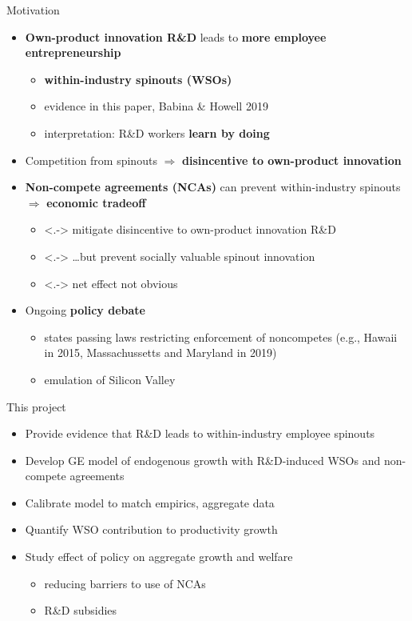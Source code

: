 \documentclass[english,usenames,dvipsnames]{beamer}
\begin{document}
\begin{frame}{Motivation}\label{motivation}
\begin{itemize}
	\item<+-> \alert{\textbf{Own-product innovation R\&D}} leads to \alert{\textbf{more employee entrepreneurship}}
	\begin{itemize}
		\item \alert{\textbf{within-industry spinouts (WSOs)}}
		\hyperlink{spinouts_examples}{} \hyperlink{spinouts_facts_from_literature}{} 
		\item evidence in this paper, Babina \& Howell 2019
		\item interpretation: R\&D workers \alert{\textbf{learn by doing}} 
	\end{itemize}
	\smallskip
	\item<+-> Competition from spinouts $\Rightarrow$ \alert{\textbf{disincentive to own-product innovation}}
	\smallskip
	\item<+-> \alert{\textbf{Non-compete agreements (NCAs)}} can prevent within-industry spinouts $\Rightarrow$ \alert{\textbf{economic tradeoff}}
	\begin{itemize}
		\item<.-> mitigate disincentive to own-product innovation R\&D
		\item<.-> \ldots but prevent socially valuable spinout innovation
		\item<.-> net effect not obvious
	\end{itemize}
	\smallskip
	\item<+-> Ongoing \alert{\textbf{policy debate}}
	\begin{itemize}
		\item states passing laws restricting enforcement of noncompetes (e.g., Hawaii in 2015, Massachussetts and Maryland in 2019) 
		\item emulation of Silicon Valley
	\end{itemize}
\end{itemize}
\end{frame}

\begin{frame}{This project}
\begin{itemize}
	\item Provide evidence that R\&D leads to within-industry employee spinouts
	\smallskip
	\item Develop GE model of endogenous growth with R\&D-induced WSOs and non-compete agreements
	\smallskip
	\item Calibrate model to match empirics, aggregate data
	\smallskip
	\item Quantify WSO contribution to productivity growth
	\smallskip
	\item Study effect of policy on aggregate growth and welfare
	\begin{itemize}
		\item reducing barriers to use of NCAs
		\item R\&D subsidies
	\end{itemize}
\end{itemize}
\end{frame}
\end{document}
